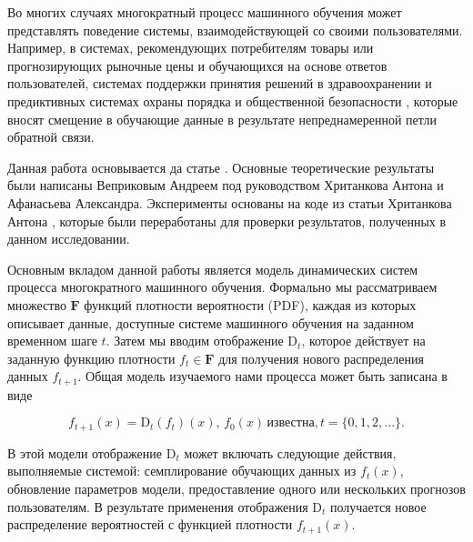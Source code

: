 Во многих случаях многократный процесс машинного обучения может представлять поведение системы, взаимодействующей со своими пользователями. Например, в системах, рекомендующих потребителям товары или прогнозирующих рыночные цены \cite{khritankov2021existence, sinha2016deconvolving} и обучающихся на основе ответов пользователей, системах поддержки принятия решений в здравоохранении \cite{adam2020hidden} и предиктивных системах охраны порядка и общественной безопасности \cite{ensign2018runaway}, которые вносят смещение в обучающие данные в результате непреднамеренной петли обратной связи.

Данная работа основывается да статье \Red{[prerint]}. Основные теоретические результаты были написаны Веприковым Андреем под руководством Хританкова Антона и Афанасьева Александра. Эксперименты основаны на коде из статьи Хританкова Антона \cite{khritankov2021hidden}, которые были переработаны для проверки результатов, полученных в данном исследовании.

Основным вкладом данной работы является модель динамических систем \cite{galor2007discrete} процесса многократного машинного обучения. Формально мы рассматриваем множество $\textbf{F}$ функций плотности вероятности (PDF), каждая из которых описывает данные, доступные системе машинного обучения на заданном временном шаге $t$. Затем мы вводим отображение $\text{D}_t$, которое действует на заданную функцию плотности $f_t \in \textbf{F}$ для получения нового распределения данных $f_{t+1}$. Общая модель изучаемого нами процесса может быть записана в виде

\begin{equation*}
        f_{t+1}(x) = \text{D}_t(f_t)(x),\, f_0(x)\, \text{известна}, t = \{0, 1, 2,...\}.
\end{equation*}

В этой модели отображение $\text{D}_t$ может включать следующие действия, выполняемые системой: семплирование обучающих данных из $f_t(x)$, обновление параметров модели, предоставление одного или нескольких прогнозов пользователям. В результате применения отображения $\text{D}_t$ получается новое распределение вероятностей с функцией плотности $f_{t+1}(x)$.


